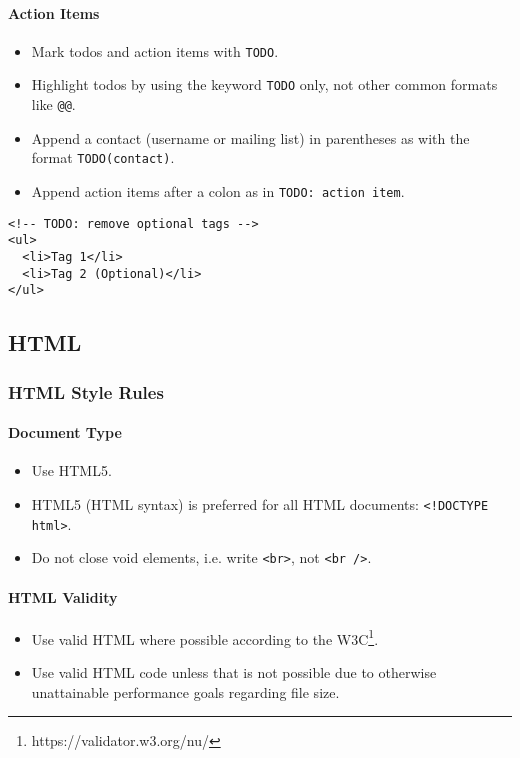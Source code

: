 \documentclass[a4paper, 11pt]{article}
\begin{document}
\paragraph{Action Items}
\begin{itemize}
\item Mark todos and action items with \texttt{TODO}.
\item Highlight todos by using the keyword \texttt{TODO} only, not other common formats like \texttt{@@}.
\item Append a contact (username or mailing list) in parentheses as with the format \texttt{TODO(contact)}.
\item Append action items after a colon as in \texttt{TODO: action item}.
\end{itemize}
\begin{verbatim}
<!-- TODO: remove optional tags -->
<ul>
  <li>Tag 1</li>
  <li>Tag 2 (Optional)</li>
</ul>
\end{verbatim}

\pagebreak

\subsection{HTML}

\subsubsection{HTML Style Rules}

\paragraph{Document Type}
\begin{itemize}
\item Use HTML5.
\item HTML5 (HTML syntax) is preferred for all HTML documents: \texttt{<!DOCTYPE html>}.
\item Do not close void elements, i.e. write \texttt{<br>}, not \texttt{<br />}.
\end{itemize}

\paragraph{HTML Validity}
\begin{itemize}
\item Use valid HTML where possible according to the W3C\footnote{https://validator.w3.org/nu/}.
\item Use valid HTML code unless that is not possible due to otherwise unattainable performance goals regarding file size.
\end{itemize}
\end{document}
